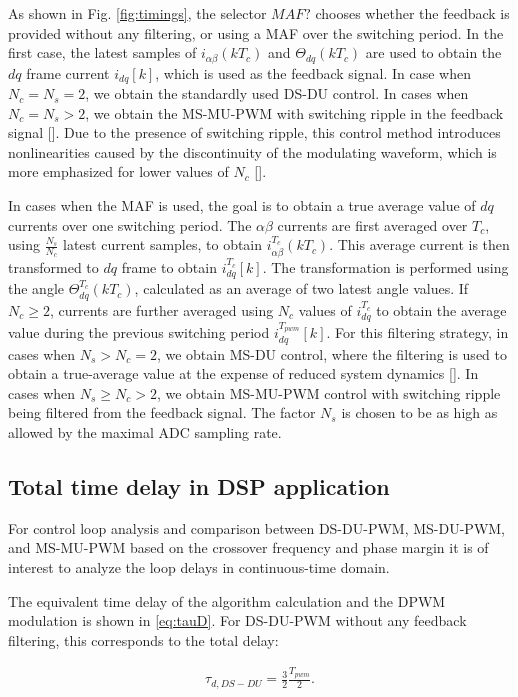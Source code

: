 \documentclass[journal]{IEEEtran}
\begin{document}
As shown in Fig. \ref{fig:timings}, the selector $MAF?$ chooses whether the feedback is provided without any filtering, or using a MAF over the switching period. In the first case, the latest samples of $i_{\alpha \beta}(kT_c)$ and $\Theta_{dq}(kT_c)$ are used to obtain the $dq$ frame current $i_{dq}[k]$, which is used as the feedback signal. In case when $N_c = N_s = 2$, we obtain the standardly used DS-DU control. In cases when $N_c = N_s > 2$, we obtain the MS-MU-PWM with switching ripple in the feedback signal []. Due to the presence of switching ripple, this control method introduces nonlinearities caused by the discontinuity of the modulating waveform, which is more emphasized for lower values of $N_c$ [].

In cases when the MAF is used, the goal is to obtain a true average value of $dq$ currents over one switching period. The $\alpha \beta$ currents are first averaged over $T_c$, using $\frac{N_s}{N_c}$ latest current samples, to obtain $i_{\alpha \beta}^{T_c} (kT_c)$. This average current is then transformed to $dq$ frame to obtain $i_{dq}^{T_c} [k]$. The transformation is performed using the angle $\Theta_{dq}^{T_c}(kT_c)$, calculated as an average of two latest angle values. If $N_c\geq 2$, currents are further averaged using $N_c$ values of $i_{dq}^{T_c}$ to obtain the average value during the previous switching period $i_{dq}^{T_{pwm}}[k]$.
For this filtering strategy, in cases when $N_s>N_c = 2$, we obtain MS-DU control, where the filtering is used to obtain a true-average value at the expense of reduced system dynamics []. In cases when $N_s \geq N_c > 2$, we obtain MS-MU-PWM control with switching ripple being filtered from the feedback signal. The factor $N_s$ is chosen to be as high as allowed by the maximal ADC sampling rate.

\subsection{Total time delay in DSP application}

For control loop analysis and comparison between DS-DU-PWM, MS-DU-PWM, and MS-MU-PWM based on the crossover frequency and phase margin it is of interest to analyze the loop delays in continuous-time domain.

The equivalent time delay of the algorithm calculation and the DPWM modulation is shown in \eqref{eq:tauD}. For DS-DU-PWM without any feedback filtering, this corresponds to the total delay:

\begin{equation}
\begin{aligned}
\tau_{d,DS-DU} = \frac{3}{2} \frac{T_{pwm}}{2}.
\label{eq:tauDSDU} 
\end{aligned}    
\end{equation}
\end{document}
